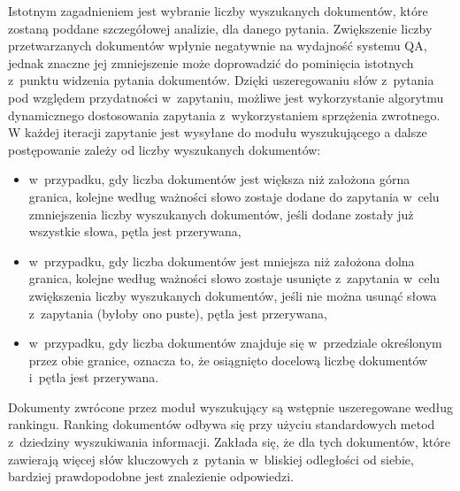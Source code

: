 \documentclass[a4paper, twoside, openright, 12pt]{report}
\begin{document}
            Istotnym zagadnieniem jest wybranie liczby wyszukanych dokumentów, które zostaną poddane szczegółowej
            analizie, dla danego pytania. Zwiększenie liczby przetwarzanych dokumentów wpłynie negatywnie na wydajność
            systemu QA, jednak znaczne jej zmniejszenie może doprowadzić do pominięcia istotnych z~punktu widzenia
            pytania dokumentów. Dzięki uszeregowaniu słów z~pytania pod względem przydatności w~zapytaniu, możliwe
            jest wykorzystanie algorytmu dynamicznego dostosowania zapytania z~wykorzystaniem sprzężenia zwrotnego.
            W każdej iteracji zapytanie jest wysyłane do modułu wyszukującego a dalsze postępowanie zależy od liczby
            wyszukanych dokumentów:
            \begin{itemize}
                \item w~przypadku, gdy liczba dokumentów jest większa niż założona górna granica, kolejne według ważności
                    słowo zostaje dodane do zapytania w~celu zmniejszenia liczby wyszukanych dokumentów, jeśli dodane zostały już
                    wszystkie słowa, pętla jest przerywana,
                \item w~przypadku, gdy liczba dokumentów jest mniejsza niż założona dolna granica, kolejne według ważności
                    słowo zostaje usunięte z~zapytania w~celu zwiększenia liczby wyszukanych dokumentów, jeśli nie można
                    usunąć słowa z~zapytania (byłoby ono puste), pętla jest przerywana,
                \item w~przypadku, gdy liczba dokumentów znajduje się w~przedziale określonym przez obie granice,
                    oznacza to, że osiągnięto docelową liczbę dokumentów i~pętla jest przerywana.
            \end{itemize}

            Dokumenty zwrócone przez moduł wyszukujący są wstępnie uszeregowane według rankingu. Ranking dokumentów
            odbywa się przy użyciu standardowych metod z~dziedziny wyszukiwania informacji. Zakłada się, że dla tych
            dokumentów, które zawierają więcej słów kluczowych z~pytania w~bliskiej odległości od siebie, bardziej
            prawdopodobne jest znalezienie odpowiedzi.
\end{document}
